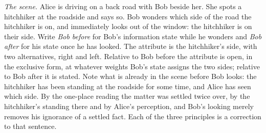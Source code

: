 \textit{The scene.} Alice is driving on a back road with Bob beside her. She spots a hitchhiker at the roadside and says so. Bob wonders which side of the road the hitchhiker is on, and immediately looks out of the window: the hitchhiker is on their side. Write \emph{Bob before} for Bob's information state while he wonders and \emph{Bob after} for his state once he has looked. The attribute is the hitchhiker's side, with two alternatives, right and left. Relative to Bob before the attribute is open, in the exclusive form, at whatever weights Bob's state assigns the two sides; relative to Bob after it is stated. Note what is already in the scene before Bob looks: the hitchhiker has been standing at the roadside for some time, and Alice has seen which side. By the one-place reading the matter was settled twice over, by the hitchhiker's standing there and by Alice's perception, and Bob's looking merely removes his ignorance of a settled fact. Each of the three principles is a correction to that sentence.

